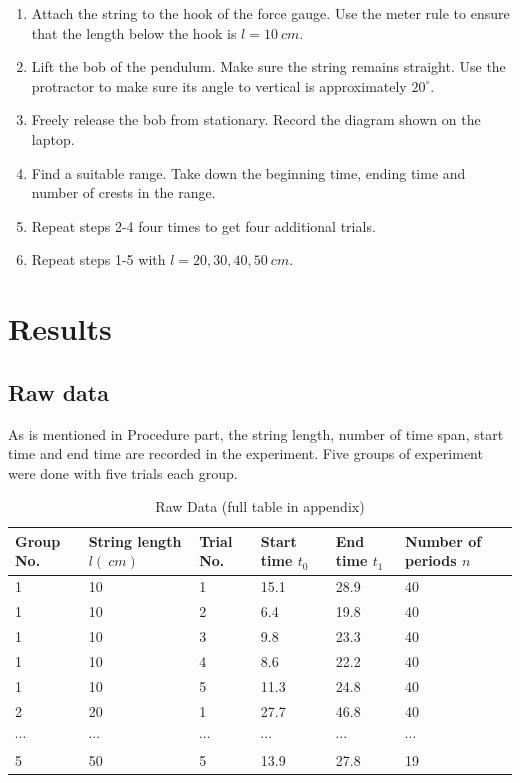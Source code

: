 \documentclass[a4paper]{article}
\newcommand{\grayrow}{\rowcolor[gray]{0.925}}
\begin{document}
\begin{enumerate}
    \item Attach the string to the hook of the force gauge. Use the meter rule to ensure that the length below the hook is $l = \SI{10}{cm}$.
    \item Lift the bob of the pendulum. Make sure the string remains straight. Use the protractor to make sure its angle to vertical is approximately $20^\circ$.
    \item Freely release the bob from stationary. Record the diagram shown on the laptop.
    \item Find a suitable range. Take down the beginning time, ending time and number of crests in the range. 
    \item Repeat steps 2-4 four times to get four additional trials.
    \item Repeat steps 1-5 with $l = 20, 30, 40, 50 \SI{}{cm}$.
\end{enumerate}

\section{Results}

\subsection{Raw data}

As is mentioned in Procedure part, the string length, number of time span, start time and end time are recorded in the experiment. Five groups of experiment were done with five trials each group. 

\begin{table}[!ht]
    \centering
    \caption{Raw Data (full table in appendix)}
    \label{tab.rawd}
    \begin{tabularx}{\textwidth}{p{1cm} X p{1cm} X X X}
    \hline
        Group No. & String length $l(\SI{}{cm})$ & Trial No. & Start time $t_0$ & End time $t_1$ & Number of periods $n$ \\ \hline
        \grayrow 1 & 10 & 1 & 15.1 & 28.9 & 40  \\ %
        1 & 10 & 2 & 6.4 & 19.8 & 40  \\ %
        \grayrow 1 & 10 & 3 & 9.8 & 23.3 & 40  \\ %
        1 & 10 & 4 & 8.6 & 22.2 & 40  \\ %
        \grayrow 1 & 10 & 5 & 11.3 & 24.8 & 40  \\ %
        2 & 20 & 1 & 27.7 & 46.8 & 40  \\ %
        \grayrow$\cdots$ & $\cdots$ & $\cdots$ & $\cdots$ & $\cdots$ & $\cdots$ \\ %
        5 & 50 & 5 & 13.9 & 27.8 & 19  \\ \hline
    \end{tabularx}
\end{table}
\end{document}
